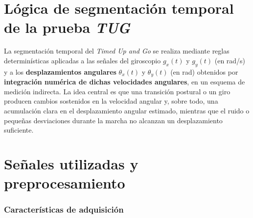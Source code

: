 \documentclass[12pt]{report}
\begin{document}
\begin{justify}






    \section{Lógica de segmentación temporal de la prueba \textit{TUG}}
    \label{sec:segmentation-logic}

    La segmentación temporal del \textit{Timed Up and Go} se realiza mediante reglas determinísticas aplicadas a las señales del giroscopio $g_x(t)$ y $g_y(t)$ (en rad/s) y a los \textbf{desplazamientos angulares} $\theta_x(t)$ y $\theta_y(t)$ (en rad) obtenidos por \textbf{integración numérica de dichas velocidades angulares}, en un esquema de medición indirecta. La idea central es que una transición postural o un giro producen cambios sostenidos en la velocidad angular y, sobre todo, una acumulación clara en el desplazamiento angular estimado, mientras que el ruido o pequeñas desviaciones durante la marcha no alcanzan un desplazamiento suficiente.

    \section{Señales utilizadas y preprocesamiento}
    \label{sec:signals-preproc}

    \subsubsection*{Características de adquisición}


\end{justify}
\end{document}
